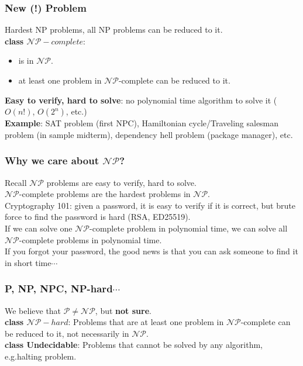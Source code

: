 \documentclass[t]{beamer}
\begin{document}
        \begin{frame}
            \frametitle{New (!) Problem}
             Hardest NP problems, all NP problems can be reduced to it.\\
             \textbf{class $\mathcal{NP}-complete$}:
            \begin{itemize}
                \item<3-> is in $\mathcal{NP}$.
                \item<4-> at least one problem in $\mathcal{NP}$-complete can be reduced to it.
            \end{itemize}

            \bigskip
             \textbf{Easy to verify, hard to solve}: no polynomial time algorithm to solve it ($O(n!)$, $O(2^n)$, etc.)\\
             \textbf{Example}: SAT problem (first NPC), Hamiltonian cycle/Traveling salesman problem (in sample midterm), dependency hell problem (package manager), etc.
        \end{frame}

        \begin{frame}
            \frametitle{Why we care about $\mathcal{NP}$?}
             Recall $\mathcal{NP}$ problems are easy to verify, hard to solve.\\
             $\mathcal{NP}$-complete problems are the hardest problems in $\mathcal{NP}$.\\

            \bigskip
             Cryptography 101: given a password, it is easy to verify if it is correct, but brute force to find the password is hard (RSA, ED25519).\\
             If we can solve one $\mathcal{NP}$-complete problem in polynomial time, we can solve all $\mathcal{NP}$-complete problems in polynomial time.\\
             If you forgot your password, the good news is that you can ask someone to find it in short time$\cdots$\\
        \end{frame}

        \begin{frame}
            \frametitle{P, NP, NPC, NP-hard$\cdots$}
            We believe that $\mathcal{P} \neq \mathcal{NP}$, but \textbf{not sure}.\\

            \bigskip
             \textbf{class $\mathcal{NP}-hard$}: Problems that are at least one problem in $\mathcal{NP}$-complete can be reduced to it, not necessarily in $\mathcal{NP}$.\\
             \textbf{class Undecidable}: Problems that cannot be solved by any algorithm, e.g.halting problem.\\
        \end{frame}
\end{document}

